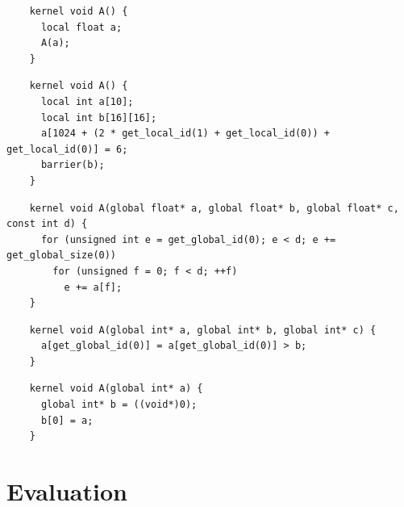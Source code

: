 \newsavebox{\IntelSPIRMetadata}
\begin{lrbox}{\IntelSPIRMetadata}
  \hspace{1.5em}
  \begin{lstlisting}
    kernel void A() {
      local float a;
      A(a);
    }
  \end{lstlisting}
\end{lrbox}

\newsavebox{\IntelRemoveDupeBarrier}
\begin{lrbox}{\IntelRemoveDupeBarrier}
  \hspace{1.5em}
  \begin{lstlisting}
    kernel void A() {
      local int a[10];
      local int b[16][16];
      a[1024 + (2 * get_local_id(1) + get_local_id(0)) + get_local_id(0)] = 6;
      barrier(b);
    }
  \end{lstlisting}
\end{lrbox}

\newsavebox{\IntelCombineRedundant}
\begin{lrbox}{\IntelCombineRedundant}
  \hspace{1.5em}
  \begin{lstlisting}
    kernel void A(global float* a, global float* b, global float* c, const int d) {
      for (unsigned int e = get_global_id(0); e < d; e += get_global_size(0))
        for (unsigned f = 0; f < d; ++f)
          e += a[f];
    }
  \end{lstlisting}
\end{lrbox}


\newsavebox{\BeigPtrAssertion}
\begin{lrbox}{\BeigPtrAssertion}
  \hspace{1.5em}
  \begin{lstlisting}
    kernel void A(global int* a, global int* b, global int* c) {
      a[get_global_id(0)] = a[get_global_id(0)] > b;
    }
  \end{lstlisting}
\end{lrbox}

\newsavebox{\BeigIterAssertion}
\begin{lrbox}{\BeigIterAssertion}
  \hspace{1.5em}
  \begin{lstlisting}
    kernel void A(global int* a) {
      global int* b = ((void*)0);
      b[0] = a;
    }
  \end{lstlisting}
\end{lrbox}


\section{Evaluation}%
\label{sec:eval}


